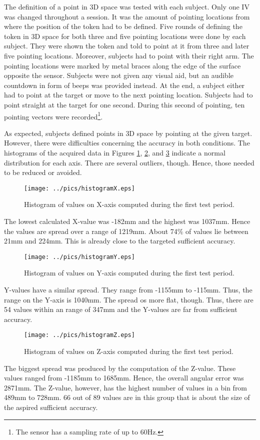 The definition of a point in \ac{3D} space was tested with each subject. Only one \ac{IV} was changed throughout a session. It was the amount of pointing locations from where the position of the token had to be defined. Five rounds of defining the token in \ac{3D} space for both three and five pointing locations were done by each subject. They were shown the token and told to point at it from three and later five pointing locations. Moreover, subjects had to point with their right arm. The pointing locations were marked by metal braces along the edge of the surface opposite the sensor. Subjects were not given any visual aid, but an audible countdown in form of beeps was provided instead. At the end, a subject either had to point at the target or move to the next pointing location. Subjects had to point straight at the target for one second. During this second of pointing, ten pointing vectors were recorded\footnote{The sensor has a sampling rate of up to 60Hz.}.  

As expected, subjects defined points in \ac{3D} space by pointing at the given target. However, there were difficulties concerning the accuracy in both conditions. The histograms of the acquired data in Figures \ref{fig:testing_1_histoX}, \ref{fig:testing_1_histoY}, and \ref{fig:testing_1_histoZ} indicate a normal distribution for each axis. There are several outliers, though. Hence, those needed to be reduced or avoided.
\begin{figure}[H]%
\texttt{[image: ../pics/histogramX.eps]}%
\caption{Histogram of values on X-axis computed during the first test period.}%
\label{fig:testing_1_histoX}%
\end{figure}
The lowest calculated X-value was -182mm and the highest was 1037mm. Hence the values are spread over a range of 1219mm. About 74$\%$ of values lie between 21mm and 224mm. This is already close to the targeted sufficient accuracy.
\begin{figure}[H]%
\texttt{[image: ../pics/histogramY.eps]}%
\caption{Histogram of values on Y-axis computed during the first test period.}%
\label{fig:testing_1_histoY}%
\end{figure}
Y-values have a similar spread. They range from -1155mm to -115mm. Thus, the range on the Y-axis is 1040mm. The spread os more flat, though. Thus, there are 54 values within an range of 347mm and the Y-values are far from sufficient accuracy.
\begin{figure}[H]%
\texttt{[image: ../pics/histogramZ.eps]}%
\caption{Histogram of values on Z-axis computed during the first test period.}%
\label{fig:testing_1_histoZ}%
\end{figure}
The biggest spread was produced by the computation of the Z-value. These values ranged from -1185mm to 1685mm. Hence, the overall angular error was 2871mm. The Z-value, however, has the highest number of values in a bin from 489mm to 728mm. 66 out of 89 values are in this group that is about the size of the aspired sufficient accuracy.

